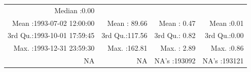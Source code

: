 \documentclass[
  10pt,
  a4paper,oneside]{article}
\begin{document}
\begin{longtable}[]{@{}rrrr@{}}
\begin{minipage}[t]{0.18\columnwidth}
Median :0.00\strut
\end{minipage}\tabularnewline
\begin{minipage}[t]{0.34\columnwidth}\raggedleft
Mean :1993-07-02 12:00:00\strut
\end{minipage} & \begin{minipage}[t]{0.19\columnwidth}\raggedleft
Mean : 89.66\strut
\end{minipage} & \begin{minipage}[t]{0.18\columnwidth}\raggedleft
Mean : 0.47\strut
\end{minipage} & \begin{minipage}[t]{0.18\columnwidth}\raggedleft
Mean :0.01\strut
\end{minipage}\tabularnewline
\begin{minipage}[t]{0.34\columnwidth}\raggedleft
3rd Qu.:1993-10-01 17:59:45\strut
\end{minipage} & \begin{minipage}[t]{0.19\columnwidth}\raggedleft
3rd Qu.:117.56\strut
\end{minipage} & \begin{minipage}[t]{0.18\columnwidth}\raggedleft
3rd Qu.: 0.82\strut
\end{minipage} & \begin{minipage}[t]{0.18\columnwidth}\raggedleft
3rd Qu.:0.00\strut
\end{minipage}\tabularnewline
\begin{minipage}[t]{0.34\columnwidth}\raggedleft
Max. :1993-12-31 23:59:30\strut
\end{minipage} & \begin{minipage}[t]{0.19\columnwidth}\raggedleft
Max. :162.81\strut
\end{minipage} & \begin{minipage}[t]{0.18\columnwidth}\raggedleft
Max. : 2.89\strut
\end{minipage} & \begin{minipage}[t]{0.18\columnwidth}\raggedleft
Max. :0.86\strut
\end{minipage}\tabularnewline
\begin{minipage}[t]{0.34\columnwidth}\raggedleft
NA\strut
\end{minipage} & \begin{minipage}[t]{0.19\columnwidth}\raggedleft
NA\strut
\end{minipage} & \begin{minipage}[t]{0.18\columnwidth}\raggedleft
NA's :193092\strut
\end{minipage} & \begin{minipage}[t]{0.18\columnwidth}\raggedleft
NA's :193121\strut
\end{minipage}\tabularnewline
\bottomrule
\end{longtable}
\end{document}
